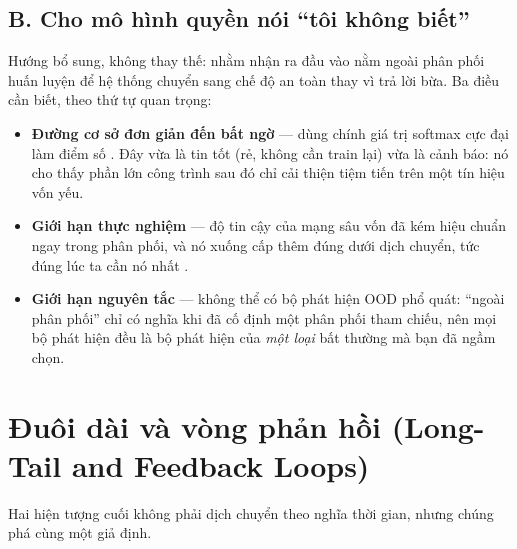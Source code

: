 \documentclass[../../deep_learning.tex]{subfiles}
\begin{document}
\subsection{B. Cho mô hình quyền nói ``tôi không biết''}

Hướng bổ sung, không thay thế:  nhằm nhận ra đầu vào nằm ngoài phân phối huấn luyện để hệ thống chuyển sang chế độ an toàn thay vì trả lời bừa. Ba điều cần biết, theo thứ tự quan trọng:
\begin{itemize}
\item \textbf{Đường cơ sở đơn giản đến bất ngờ} --- dùng chính giá trị softmax cực đại làm điểm số \cite{hendrycks2017baseline}. Đây vừa là tin tốt (rẻ, không cần train lại) vừa là cảnh báo: nó cho thấy phần lớn công trình sau đó chỉ cải thiện tiệm tiến trên một tín hiệu vốn yếu.
\item \textbf{Giới hạn thực nghiệm} --- độ tin cậy của mạng sâu vốn đã kém hiệu chuẩn ngay trong phân phối, và nó xuống cấp thêm đúng dưới dịch chuyển, tức đúng lúc ta cần nó nhất \cite{ovadia2019can}.
\item \textbf{Giới hạn nguyên tắc} --- không thể có bộ phát hiện OOD phổ quát: ``ngoài phân phối'' chỉ có nghĩa khi đã cố định một phân phối tham chiếu, nên mọi bộ phát hiện đều là bộ phát hiện của \emph{một loại} bất thường mà bạn đã ngầm chọn.
\end{itemize}

\section{Đuôi dài và vòng phản hồi (Long-Tail and Feedback Loops)}
Hai hiện tượng cuối không phải dịch chuyển theo nghĩa thời gian, nhưng chúng phá cùng một giả định.
\end{document}
